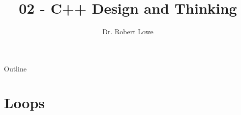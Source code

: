 \documentclass[]{beamer}
\title{02 - C++ Design and Thinking}
\author{Dr. Robert Lowe\\}
\institute[Maryville College] %
{
  Division of Mathematics and Computer Science\\
  Maryville College
}
\date[]{}
\begin{document}
\begin{frame}
  \titlepage
\end{frame}

\begin{frame}{Outline}
  \tableofcontents
\end{frame}




\section{Loops}
\end{document}
